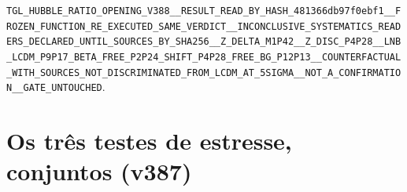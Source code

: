 \documentclass[11pt]{article}
\theoremstyle{definition}\newtheorem{deriv}{Derivação}
\begin{document}
\texttt{TGL\_\allowbreak{}HUBBLE\_\allowbreak{}RATIO\_\allowbreak{}OPENING\_\allowbreak{}V388\_\allowbreak{}\_\allowbreak{}RESULT\_\allowbreak{}READ\_\allowbreak{}BY\_\allowbreak{}HASH\_\allowbreak{}481366db97f0ebf1\_\allowbreak{}\_\allowbreak{}FROZEN\_\allowbreak{}FUNCTION\_\allowbreak{}RE\_\allowbreak{}EXECUTED\_\allowbreak{}SAME\_\allowbreak{}VERDICT\_\allowbreak{}\_\allowbreak{}INCONCLUSIVE\_\allowbreak{}SYSTEMATICS\_\allowbreak{}READERS\_\allowbreak{}DECLARED\_\allowbreak{}UNTIL\_\allowbreak{}SOURCES\_\allowbreak{}BY\_\allowbreak{}SHA256\_\allowbreak{}\_\allowbreak{}Z\_\allowbreak{}DELTA\_\allowbreak{}M1P42\_\allowbreak{}\_\allowbreak{}Z\_\allowbreak{}DISC\_\allowbreak{}P4P28\_\allowbreak{}\_\allowbreak{}LNB\_\allowbreak{}LCDM\_\allowbreak{}P9P17\_\allowbreak{}BETA\_\allowbreak{}FREE\_\allowbreak{}P2P24\_\allowbreak{}SHIFT\_\allowbreak{}P4P28\_\allowbreak{}FREE\_\allowbreak{}BG\_\allowbreak{}P12P13\_\allowbreak{}\_\allowbreak{}COUNTERFACTUAL\_\allowbreak{}WITH\_\allowbreak{}SOURCES\_\allowbreak{}NOT\_\allowbreak{}DISCRIMINATED\_\allowbreak{}FROM\_\allowbreak{}LCDM\_\allowbreak{}AT\_\allowbreak{}5SIGMA\_\allowbreak{}\_\allowbreak{}NOT\_\allowbreak{}A\_\allowbreak{}CONFIRMATION\_\allowbreak{}\_\allowbreak{}GATE\_\allowbreak{}UNTOUCHED}.

\section*{Os três testes de estresse, conjuntos (v387)}

\end{document}
